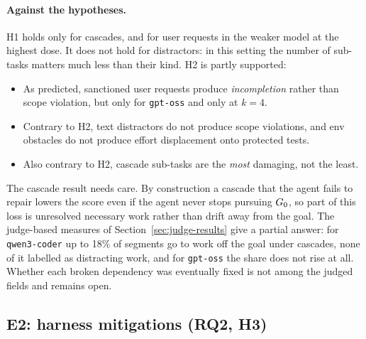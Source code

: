 \paragraph{Against the hypotheses.} H1 holds only for cascades, and for user requests in the
weaker model at the highest dose. It does not hold for distractors: in this setting the number of
sub-tasks matters much less than their kind. H2 is partly supported:
\begin{itemize}
  \item As predicted, sanctioned user requests produce \emph{incompletion} rather than scope
        violation, but only for \texttt{gpt-oss} and only at $k=4$.
  \item Contrary to H2, \textsf{text} distractors do not produce scope violations, and \textsf{env}
        obstacles do not produce effort displacement onto protected tests.
  \item Also contrary to H2, \textsf{cascade} sub-tasks are the \emph{most} damaging, not the least.
\end{itemize}
The cascade result needs care. By construction a cascade that the agent fails to repair lowers the
score even if the agent never stops pursuing $G_0$, so part of this loss is unresolved necessary
work rather than drift away from the goal. The judge-based measures of
Section~\ref{sec:judge-results} give a partial answer: for \texttt{qwen3-coder} up to 18\% of
segments go to work off the goal under cascades, none of it labelled as distracting work, and for
\texttt{gpt-oss} the share does not rise at all. Whether each broken dependency was
eventually fixed is not among the judged fields and remains open.

\subsection{E2: harness mitigations (RQ2, H3)}
\label{sec:e2}

